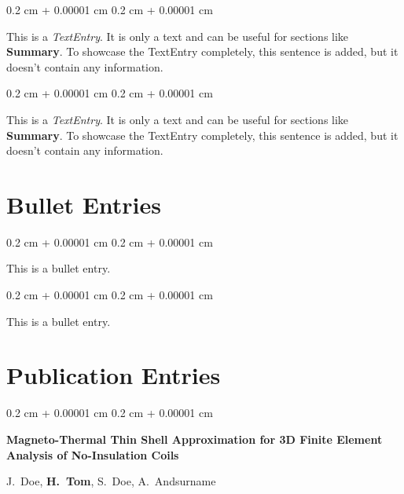 \documentclass[10pt, letterpaper]{article}
\newenvironment{onecolentry}{
    \begin{adjustwidth}{
        0.2 cm + 0.00001 cm
    }{
        0.2 cm + 0.00001 cm
    }
}{
    \end{adjustwidth}
} %
\begin{document}
        \vspace{0.2 cm}

        \begin{onecolentry}
            This is a \textit{TextEntry}. It is only a text and can be useful for sections like \textbf{Summary}. To showcase the TextEntry completely, this sentence is added, but it doesn't contain any information.
        \end{onecolentry}

        \vspace{0.2 cm}

        \begin{onecolentry}
            This is a \textit{TextEntry}. It is only a text and can be useful for sections like \textbf{Summary}. To showcase the TextEntry completely, this sentence is added, but it doesn't contain any information.
        \end{onecolentry}


    
    \section{Bullet Entries}

        
        \begin{onecolentry}
            \textbullet \hspace{3pt} This is a bullet entry.
        \end{onecolentry}

        \vspace{0.2 cm}

        \begin{onecolentry}
            \textbullet \hspace{3pt} This is a bullet entry.
        \end{onecolentry}


    
    \section{Publication Entries}

        
        \begin{samepage}
            \begin{onecolentry}
                \textbf{Magneto-Thermal Thin Shell Approximation for 3D Finite Element Analysis of No-Insulation Coils}

                \vspace{0.10 cm}

                \mbox{J. Doe}, \mbox{\textbf{H. Tom}}, \mbox{S. Doe}, \mbox{A. Andsurname}
            \end{onecolentry}
        \end{samepage}
\end{document}
